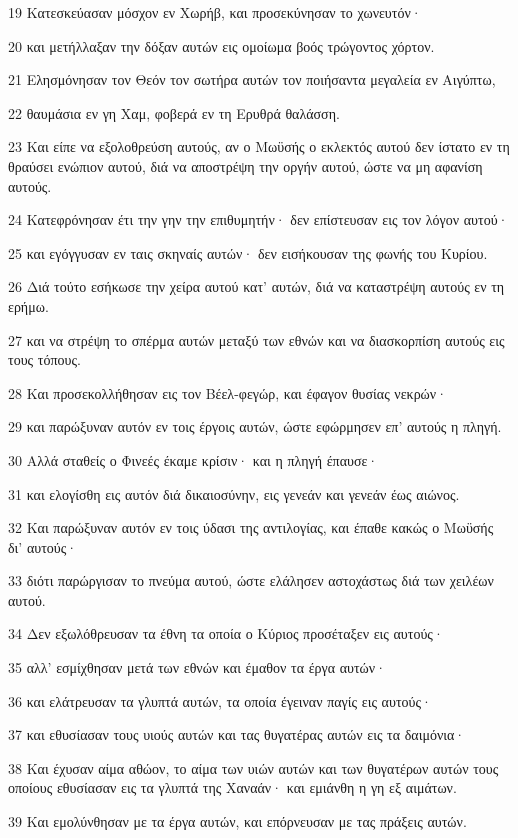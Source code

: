 \par 19 Κατεσκεύασαν μόσχον εν Χωρήβ, και προσεκύνησαν το χωνευτόν·
\par 20 και μετήλλαξαν την δόξαν αυτών εις ομοίωμα βοός τρώγοντος χόρτον.
\par 21 Ελησμόνησαν τον Θεόν τον σωτήρα αυτών τον ποιήσαντα μεγαλεία εν Αιγύπτω,
\par 22 θαυμάσια εν γη Χαμ, φοβερά εν τη Ερυθρά θαλάσση.
\par 23 Και είπε να εξολοθρεύση αυτούς, αν ο Μωϋσής ο εκλεκτός αυτού δεν ίστατο εν τη θραύσει ενώπιον αυτού, διά να αποστρέψη την οργήν αυτού, ώστε να μη αφανίση αυτούς.
\par 24 Κατεφρόνησαν έτι την γην την επιθυμητήν· δεν επίστευσαν εις τον λόγον αυτού·
\par 25 και εγόγγυσαν εν ταις σκηναίς αυτών· δεν εισήκουσαν της φωνής του Κυρίου.
\par 26 Διά τούτο εσήκωσε την χείρα αυτού κατ' αυτών, διά να καταστρέψη αυτούς εν τη ερήμω.
\par 27 και να στρέψη το σπέρμα αυτών μεταξύ των εθνών και να διασκορπίση αυτούς εις τους τόπους.
\par 28 Και προσεκολλήθησαν εις τον Βέελ-φεγώρ, και έφαγον θυσίας νεκρών·
\par 29 και παρώξυναν αυτόν εν τοις έργοις αυτών, ώστε εφώρμησεν επ' αυτούς η πληγή.
\par 30 Αλλά σταθείς ο Φινεές έκαμε κρίσιν· και η πληγή έπαυσε·
\par 31 και ελογίσθη εις αυτόν διά δικαιοσύνην, εις γενεάν και γενεάν έως αιώνος.
\par 32 Και παρώξυναν αυτόν εν τοις ύδασι της αντιλογίας, και έπαθε κακώς ο Μωϋσής δι' αυτούς·
\par 33 διότι παρώργισαν το πνεύμα αυτού, ώστε ελάλησεν αστοχάστως διά των χειλέων αυτού.
\par 34 Δεν εξωλόθρευσαν τα έθνη τα οποία ο Κύριος προσέταξεν εις αυτούς·
\par 35 αλλ' εσμίχθησαν μετά των εθνών και έμαθον τα έργα αυτών·
\par 36 και ελάτρευσαν τα γλυπτά αυτών, τα οποία έγειναν παγίς εις αυτούς·
\par 37 και εθυσίασαν τους υιούς αυτών και τας θυγατέρας αυτών εις τα δαιμόνια·
\par 38 Και έχυσαν αίμα αθώον, το αίμα των υιών αυτών και των θυγατέρων αυτών τους οποίους εθυσίασαν εις τα γλυπτά της Χαναάν· και εμιάνθη η γη εξ αιμάτων.
\par 39 Και εμολύνθησαν με τα έργα αυτών, και επόρνευσαν με τας πράξεις αυτών.
